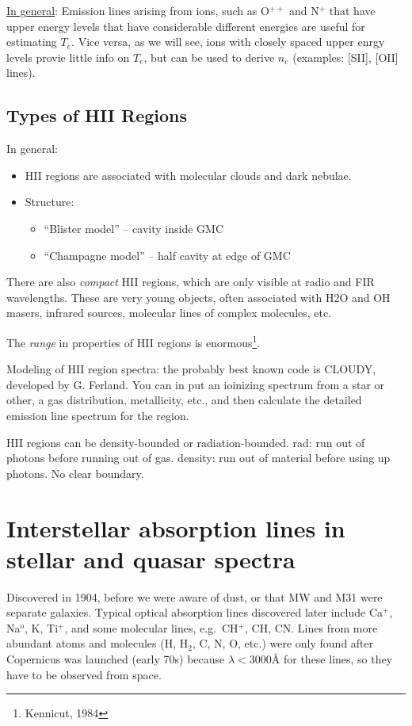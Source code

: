 \documentclass[12pt]{article}
\newcommand{\mar}[1]{\hspace{0pt}\marginpar{-\textcolor{black}{#1}-}}
\newcommand{\mynotes}[1]{\textcolor{mygreen}{#1}}
\begin{document}
\underline{In general}: Emission lines arising from ions, such as
O$^{++}$ and N$^{+}$ that have upper energy levels that have considerable
different energies are useful for estimating $T_{e}$. Vice versa,
as we will see, ions with closely spaced upper enrgy levels provie
little info on $T_{e}$, but can be used to derive $n_{e}$
(examples: [SII], [OII] lines).

\subsection{Types of HII Regions}
\mar{85}In general:
\begin{itemize}
    \item HII regions are associated with molecular clouds and dark
        nebulae.
    \item Structure:
        \begin{itemize}
            \item ``Blister model'' -- cavity inside GMC
            \item ``Champagne model'' -- half cavity at edge of GMC
        \end{itemize}
\end{itemize}
There are also \emph{compact} HII regions, which are only visible at
radio and FIR wavelengths. These are very young objects, often associated
with H2O and OH masers, infrared sources, molecular lines of complex
molecules, etc.

The \emph{range} in properties of HII regions is
enormous\footnote{Kennicut, 1984}.

Modeling of HII region spectra: the probably best known code is
CLOUDY, developed by G. Ferland. You can in put an ioinizing spectrum
from a star or other, a gas distribution, metallicity, etc., and
then calculate the detailed emission line spectrum for the region.

HII regions can be density-bounded or radiation-bounded.
rad: run out of photons before running out of gas.
density: run out of material before using up photons. No clear boundary.

\newpage
\section{Interstellar absorption lines in stellar and quasar spectra}
\mar{89}Discovered in 1904,
\mynotes{before we were aware of dust, or that
MW and M31 were separate galaxies.} Typical optical absorption lines
discovered later include Ca$^{+}$, Na$^{o}$, K, Ti$^{+}$,
and some molecular lines, e.g.\ CH$^{+}$, CH, CN.
Lines from more abundant atoms and molecules (H, H$_{2}$, C, N, O, etc.)
were only found after Copernicus was launched (early 70s) because
$\lambda < 3000$\AA{} for these lines, so they have to be observed
from space.
\end{document}
